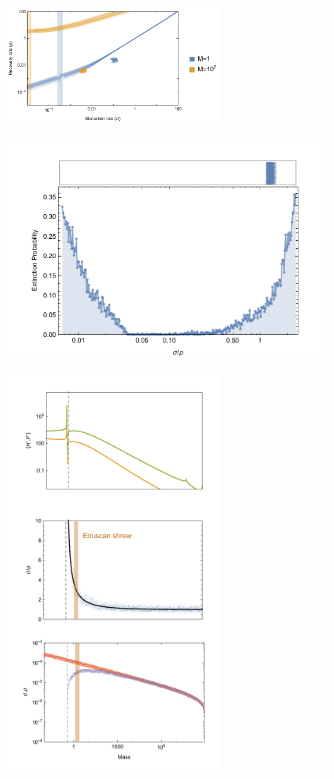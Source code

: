 \documentclass{pnastwo}
\begin{document}
\begin{figure}
\centering
\includegraphics[width=0.5\textwidth]{fig_DataHopf.pdf}
\caption{ %
}
\label{fig:hopf}
\end{figure}

\begin{figure}
\centering
\includegraphics[width=0.75\textwidth]{fig_ExtinctionAllometric.pdf}
\caption{ %
}
\label{fig:ext}
\end{figure} 
 
\begin{figure}
\centering
\includegraphics[width=0.5\textwidth]{fig_FPAllometric.pdf}
\caption{ %
}
\label{fig:mass}
\end{figure}  
 
\end{document}

